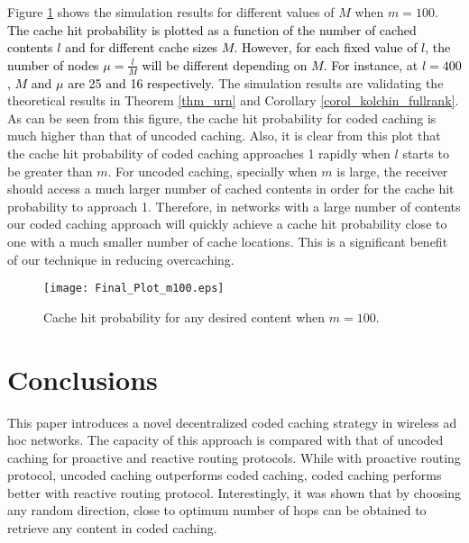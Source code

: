 \documentclass[10pt,journal]{IEEEtran}
\begin{document}
{ Figure \ref{fig_m100} shows the simulation results for different values of $M$ when $m=100$. \textcolor{black}{The cache hit probability is plotted as a function of the number of  cached contents $l$ and for different cache sizes $M$. However, for each fixed value of $l$, the number of nodes  $\mu = \frac{l}{M}$ will be different depending on $M$. For instance, at $l=400$, $M$ and $\mu$ are 25 and 16 respectively.} The simulation results are validating the theoretical results in {Theorem}  \ref{thm_urn} and {Corollary}  \ref{corol_kolchin_fullrank}. As can be seen from {this figure}, the cache hit probability for coded caching is much higher than that of uncoded caching. Also, it is clear from this plot that the cache hit probability of coded caching  approaches 1  rapidly when $l$ starts to be greater than $m$. For uncoded caching, specially when $m$ is large, the receiver should access a much larger number of cached contents in order for the cache hit probability to approach 1. Therefore, in networks with a large number of contents our coded caching approach will quickly achieve a cache hit probability close to one with a much smaller number of cache locations. This is a significant benefit of our technique in reducing  overcaching.  

\begin{figure}
    \center
      \texttt{[image: Final\_Plot\_m100.eps]}
\caption{Cache hit probability for any desired content when $m=100$.} 
\vspace{-0.2in}
\label{fig_m100}
\end{figure}


\section{Conclusions}
\label{conc_sec}
This paper introduces a novel decentralized coded caching strategy in wireless ad hoc networks. The capacity of this approach is compared with that of uncoded caching for proactive and reactive routing protocols. While with proactive routing protocol, uncoded caching outperforms coded caching, coded caching performs better with reactive routing protocol. Interestingly, it was shown that by choosing any random direction, close to optimum number of hops can be obtained to retrieve any content in coded caching.

}
\end{document}
